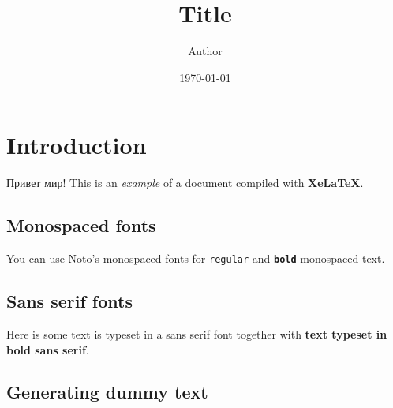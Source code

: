 \documentclass{article}
\title{Title}
\author{Author}
\date{\today}
\begin{document}
\maketitle

\section{Introduction}
Привет мир! This is an \textit{example} of a document compiled with \textbf{XeLaTeX}.

\subsection{Monospaced fonts}
You can use Noto's monospaced fonts for \texttt{regular} and \texttt{\textbf{bold}} monospaced text.

\subsection{Sans serif fonts}
Here is some \textsf{text is typeset in a sans serif font} together with \textbf{\textsf{text typeset in bold sans serif}}.

\subsection{Generating dummy text}

\blindtext
\end{document}

